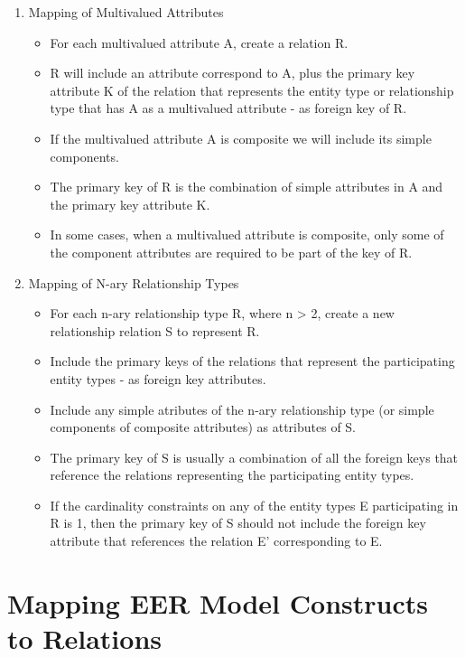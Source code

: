 \documentclass[10pt]{article}
\begin{document}
\begin{enumerate}
	\item Mapping of Multivalued Attributes 
		\begin{itemize}
			\item For each multivalued attribute A, create a relation R.
			\item R will include an attribute correspond to A, plus the primary key attribute K of the relation that represents the entity type or relationship type that has A as a multivalued attribute - as foreign key of R.
			\item If the multivalued attribute A is composite we will include its simple components.
			\item The primary key of R is the combination of simple attributes in A and the primary key attribute K.
			\item In some cases, when a multivalued attribute is composite, only some of the component attributes are required to be part of the key of R.
		\end{itemize}

	\item Mapping of N-ary Relationship Types
		\begin{itemize}
			\item For each n-ary relationship type R, where n > 2, create a new relationship relation S to represent R.
			\item Include the primary keys of the relations that represent the participating entity types - as foreign key attributes.
			\item Include any simple atributes of the n-ary relationship type (or simple components of composite attributes) as attributes of S.
			\item The primary key of S is usually a combination of all the foreign keys that reference the relations representing the participating entity types.
			\item If the cardinality constraints on any of the entity types E participating in R is 1, then the primary key of S should not include the foreign key attribute that references the relation E' corresponding to E. 
		\end{itemize}

\end{enumerate}

\section*{Mapping EER Model Constructs to Relations}
\end{document}
